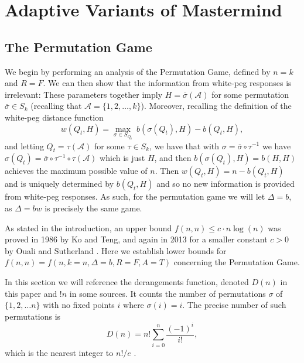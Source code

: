 \documentclass[12pt, a4paper]{article}
\newcommand{\inv}{^{-1}}              %
\begin{document}
\section{Adaptive Variants of Mastermind}
\subsection{The Permutation Game}
We begin by performing an analysis of the Permutation Game, defined by $n=k$ and $R=F$. We can then show that the information from white-peg responses is irrelevant: These parameters together imply $H=\overline{\sigma}(\mathcal{A})$ for some permutation $\overline{\sigma}\in S_k$ (recalling that $\mathcal{A}=\{1,2,\ldots, k\}$). Moreover, recalling the definition of the white-peg distance function
\begin{equation*}
	w(Q_t, H) = \max_{\sigma\in S_{Q_t}}~b(\sigma(Q_t), H) - b(Q_t, H),
\end{equation*}
and letting $Q_t = \tau(\mathcal{A})$ for some $\tau \in S_k$, we have that with $\sigma = \overline{\sigma}\circ \tau\inv$ we have $\sigma(Q_t) = \overline{\sigma}\circ\tau\inv\circ\tau(\mathcal A)$ which is just $H$, and then $b(\sigma(Q_t),H) = b(H,H)$ achieves the maximum possible value of $n$. Then $w(Q_t,H) = n - b(Q_t,H)$ and is uniquely determined by $b(Q_t,H)$ and so no new information is provided from white-peg responses. As such, for the permutation game we will let $\Delta = b$, as $\Delta = bw$ is precisely the same game.

 As stated in the introduction, an upper bound $f(n, n)\le c\cdot n\log(n)$ was proved in 1986 by Ko and Teng, and again in 2013 for a smaller constant $c>0$ by Ouali and Sutherland \cite{KT86, OS13}. Here we establish lower bounds for $f(n, n) = f(n, k=n, \Delta=b, R=F, A=T)$ concerning the Permutation Game.
 
 In this section we will reference the derangements function, denoted $D(n)$ in this paper and $!n$ in some sources. It counts the number of permutations $\sigma$ of $\{1,2,\ldots n\}$ with no fixed points $i$ where $\sigma(i) = i$. The precise number of such permutations is
 \begin{equation}\label{derangements}
 D(n) = n!\sum_{i=0}^n \frac{(-1)^i}{i!},
 \end{equation}
which is the nearest integer to $n!/e$  \cite{MH03}. 
\end{document}
